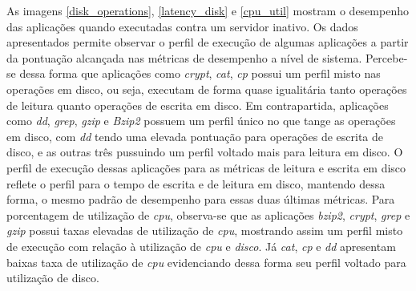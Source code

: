 As imagens \ref{disk_operations}, \ref{latency_disk} e \ref{cpu_util} mostram o desempenho das aplicações quando executadas contra um servidor inativo. Os dados apresentados permite observar o perfil de execução de algumas aplicações a partir da pontuação alcançada nas métricas de desempenho a nível de sistema. Percebe-se dessa forma que aplicações como \textit{crypt}, \textit{cat}, \textit{cp} possui um perfil misto nas operações em disco, ou seja, executam de forma quase igualitária tanto operações de leitura quanto operações de escrita em disco. Em contrapartida, aplicações como \textit{dd}, \textit{grep}, \textit{gzip} e \textit{Bzip2} possuem um perfil único no que tange as operações em disco, com \textit{dd} tendo uma elevada pontuação para operações de escrita de disco, e as outras três pussuindo um perfil voltado mais para leitura em disco. O perfil de execução dessas aplicações para as métricas de leitura e escrita em disco reflete o perfil para o tempo de escrita e de leitura em disco, mantendo dessa forma, o mesmo padrão de desempenho para essas duas últimas métricas. Para porcentagem de utilização de \textit{cpu}, observa-se que as aplicações \textit{bzip2}, \textit{crypt}, \textit{grep} e \textit{gzip} possui taxas elevadas de utilização de \textit{cpu}, mostrando assim um  perfil misto de execução com relação à utilização de \textit{cpu} e \textit{disco}. Já \textit{cat}, \textit{cp} e \textit{dd} apresentam baixas taxa de utilização de \textit{cpu} evidenciando dessa forma seu perfil voltado para utilização de disco.

